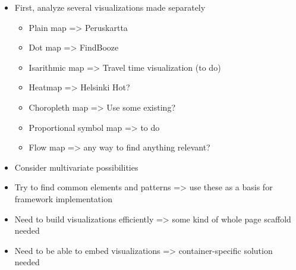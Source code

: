 \begin{itemize}
	\item First, analyze several visualizations made separately
	\begin{itemize}
		\item Plain map => Peruskartta
		\item Dot map => FindBooze
		\item Isarithmic map => Travel time visualization (to do)
		\item Heatmap => Helsinki Hot?
		\item Choropleth map => Use some existing?
		\item Proportional symbol map => to do
		\item Flow map => any way to find anything relevant?
	\end{itemize}
	\item Consider multivariate possibilities
	\item Try to find common elements and patterns => use these as a basis for framework implementation
	\item Need to build visualizations efficiently => some kind of whole page scaffold needed
	\item Need to be able to embed visualizations => container-specific solution needed
\end{itemize}
